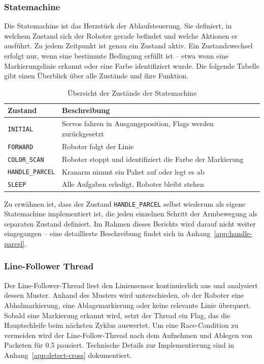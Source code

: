 \documentclass[11pt,a4paper]{article}
\begin{document}
	\subsubsection{Statemachine}
	\label{sss:statemachine}
	Die Statemachine ist das Herzstück der Ablaufsteuerung. Sie definiert, in welchem 
	Zustand sich der Roboter gerade befindet und welche Aktionen er ausführt. Zu jedem 
	Zeitpunkt ist genau ein Zustand aktiv. Ein Zustandswechsel erfolgt nur, wenn eine 
	bestimmte Bedingung erfüllt ist -- etwa wenn eine Markierungslinie erkannt oder eine 
	Farbe identifiziert wurde. Die folgende Tabelle gibt einen Überblick über alle 
	Zustände und ihre Funktion.
	
	\begin{table}[H]
		\centering
		\begin{tabular}{ll}
			\toprule
			\textbf{Zustand} & \textbf{Beschreibung} \\
			\midrule
			\texttt{INITIAL}        & Servos fahren in Ausgangsposition, Flags werden zurückgesetzt \\
			\texttt{FORWARD}        & Roboter folgt der Linie \\
			\texttt{COLOR\_SCAN}    & Roboter stoppt und identifiziert die Farbe der Markierung \\
			\texttt{HANDLE\_PARCEL} & Kranarm nimmt ein Paket auf oder legt es ab \\
			\texttt{SLEEP}          & Alle Aufgaben erledigt, Roboter bleibt stehen \\
			\bottomrule
		\end{tabular}
		\caption{Übersicht der Zustände der Statemachine}
		\label{tab:statemachine}
	\end{table}
	\noindent
	Zu erwähnen ist, dass der Zustand \texttt{HANDLE\_PARCEL} selbst wiederum als 
	eigene Statemachine implementiert ist, die jeden einzelnen Schritt der Armbewegung 
	als separaten Zustand definiert. Im Rahmen dieses Berichts wird darauf nicht weiter 
	eingegangen -- eine detaillierte Beschreibung findet sich in Anhang~\ref{app:handle-parcel}.
	
	
	\subsubsection{Line-Follower Thread}
	
	Der Line-Follower-Thread liest den Liniensensor kontinuierlich aus und analysiert 
	dessen Muster. Anhand des Musters wird unterschieden, ob der Roboter eine 
	Abholmarkierung, eine Ablagemarkierung oder keine relevante Linie überquert. 
	Sobald eine Markierung erkannt wird, setzt der Thread ein Flag, das die Hauptschleife 
	beim nächsten Zyklus auswertet. Um eine Race-Condition zu vermeiden wird der Line-Follow-Thread nach dem Aufnehmen und Ablegen von Packeten für \SI{0.5}{\sec} pausiert. Technische Details zur Implementierung sind in 
	Anhang~\ref{app:detect-cross} dokumentiert.
	
\end{document}

